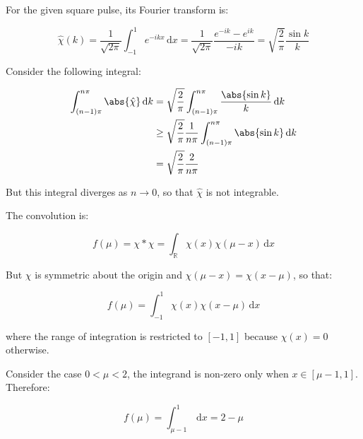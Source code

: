 \documentclass[12pt]{article}
\begin{document}

For the given square pulse, its Fourier transform is:

\begin{equation}
    \hat{\chi}(k) = \frac{1}{\sqrt{2\pi}} \int_{-1}^{1} e^{-ikx} \, \mathrm{d}x = \frac{1}{\sqrt{2\pi}} \frac{e^{-ik} - e^{ik}}{-ik} = \sqrt{\frac{2}{\pi}} \frac{\sin{k}}{k}
\end{equation}

\begin{correction}
    Consider the following integral:

    \begin{equation}
    \begin{split}
        \int_{(n-1)\pi}^{n\pi} \abs{\hat{\chi}} \, \mathrm{d}k &= \sqrt{\frac{2}{\pi}} \int_{(n-1)\pi}^{n\pi} \frac{\abs{\sin{k}}}{k} \, \mathrm{d}k \\
        &\ge \sqrt{\frac{2}{\pi}} \frac{1}{n\pi} \int_{(n-1)\pi}^{n\pi} \abs{\sin{k}} \, \mathrm{d}k \\
        &= \sqrt{\frac{2}{\pi}} \frac{2}{n\pi}
    \end{split}
    \end{equation}

    But this integral diverges as $n \to 0$, so that $\hat{\chi}$ is not integrable.
\end{correction}

The convolution is:

\begin{equation}
    f(\mu) = \chi \ast \chi = \int_{\mathbb{R}} \chi(x) \chi(\mu - x) \, \mathrm{d}x
\end{equation}

But $\chi$ is symmetric about the origin and $\chi(\mu - x) = \chi(x - \mu)$, so that:

\begin{equation}
    f(\mu) = \int_{-1}^{1} \chi(x) \chi(x - \mu) \, \mathrm{d}x
\end{equation}

where the range of integration is restricted to $[-1, 1]$ because $\chi(x) = 0$ otherwise.

Consider the case $0 < \mu < 2$, the integrand is non-zero only when $x \in [\mu - 1, 1]$. Therefore:

\begin{equation}
    f(\mu) = \int_{\mu - 1}^{1} \, \mathrm{d}x = 2 - \mu
\end{equation}
\end{document}
